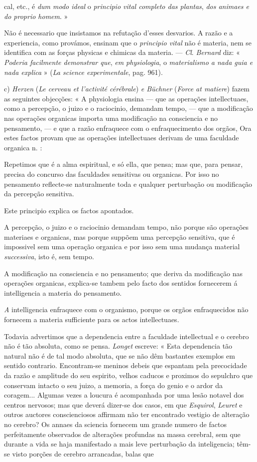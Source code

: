cal, etc., é \emph{dum modo ideal} o \emph{principio vital completo das plantas}, \emph{dos animaes e do proprio homem}. »\par Não é necessario que insistamos na refutação d'esses desvarios. A razão e a experiencia, como provámos, ensinam que o \emph{principio vital} não é materia, nem se identifica com as forças physicas e chimicas da materia. --- \emph{Cl}. \emph{Bernard} diz: « \emph{Poderia facilmente demonstrar que}, \emph{em physiologia}, o \emph{materialismo a nada guia e nada explica} » (\emph{La science experimentale}, pag. 961).\par c) \emph{Herzen} (\emph{Le cerveau et l'activité cérébrale}) \emph{e Büchner} (\emph{Force at matiere}) fazem as seguintes objecções: « A physiologia ensina --- que as operações intellectuaes, como a percepção, o juizo e o raciocinio, demandam tempo, --- que a modificação nas operações organicas importa uma modificação na consciencia e no pensamento, --- e que a razão enfraquece com o enfraquecimento dos orgãos, Ora estes factos provam que as operações intellectuaes derivam de uma faculdade organica n. :\par Repetimos que é a alma espiritual, e só ella, que pensa; mas que, para pensar, precisa do concurso das faculdades sensitivas ou organicas. Por isso no pensamento reflecte-se naturalmente toda e qualquer perturbação ou modificação da percepção sensitiva.\par Este principio explica os factos apontados.\par A percepção, o juizo e o raciocinio demandam tempo, não porque são operações materiaes e organicas, mas porque suppõem uma percepção sensitiva, que é impossivel sem uma operação organica e por isso sem uma mudança material \emph{successiva}, isto é, sem tempo.\par A modificação na consciencia e no pensamento; que deriva da modificação nas operações organicas, explica-se tambem pelo facto dos sentidos fornecerem á intelligencia a materia do pensamento.\par \emph{A} intelligencia enfraquece com o organismo, porque os orgãos enfraquecidos não fornecem a materia sufficiente para os actos intellectuaes.\par Todavia advertimos que a dependencia entre a faculdade intellectual e o cerebro não é tão absoluta, como se pensa. \emph{Longet} escreve: « Esta dependencia tão natural não é de tal modo absoluta, que se não dêm bastantes exemplos em sentido contrario. Encontram-se meninos debeis que espantam pela precocidade da razão e amplitude do seu espirito, velhos caducos e proximos do sepulchro que conservam intacto o seu juizo, a memoria, a força do genio e o ardor da coragem... Algumas vezes a loucura é acompanhada por uma lesão notavel dos centros nervosos; mas que deverá dizer-se dos casos, em que \emph{Esquirol}, \emph{Leuret} e outros auctores conscienciosos affirmam não ter encontrado vestigio de alteração no cerebro? Os annaes da sciencia fornecem um grande numero de factos perfeitamente observados de alterações profundas na massa cerebral, sem que durante a vida se haja manifestado a mais leve perturbação da inteligencia; têm-se visto porções de cerebro arrancadas, balas que 